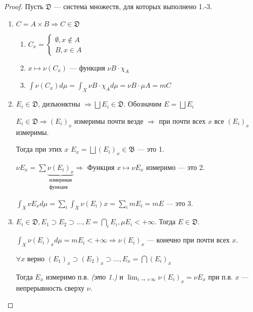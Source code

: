 \begin{proof}
    Пусть \(\mathfrak{D}\) --- система множеств, для которых выполнено 1.-3.

    \begin{enumerate}
        \item \(C = A \times B \Rightarrow C\in \mathfrak{D}\)

              \begin{enumerate}
                  \item \(C_x = \begin{cases}
                            \emptyset, x\notin A \\
                            B, x\in A
                        \end{cases}\)
                  \item \(x \mapsto \nu(C_x)\) --- функция \(\nu B \cdot \chi_A\)
                  \item \(\int \nu(C_x) d\mu = \int_X \nu B \cdot \chi_A d \mu = \nu B \cdot \mu A = mC\)
              \end{enumerate}

        \item \(E_i \in \mathfrak{D}\), дизъюнктны \( \Rightarrow \bigsqcup E_i\in \mathfrak{D}\). Обозначим \(E = \bigsqcup E_i\)

              \(E_i \in \mathfrak{D} \Rightarrow (E_i)_x\) измеримы почти везде \( \Rightarrow \) при почти всех \(x\) все \((E_i)_x\) измеримы.

              Тогда при этих \(x\) \(E_x = \bigsqcup (E_i)_x \in \mathfrak{B}\) --- это 1.

              \(\nu E_x = \sum \underbrace{\nu(E_i)_x}_{\substack{\text{измеримая} \\ \text{функция}}} \Rightarrow\) Функция \(x \mapsto \nu E_x\) измеримо --- это 2.

              \(\int_X \nu E_x d\mu = \sum_i \int_X \nu(E_i) x = \sum_i m E_i = m E\) --- это 3.

        \item \(E_i \in \mathfrak{D}, E_1 \supset E_2 \supset \dots , E = \bigcap_i E_i, \mu E_i < +\infty\). Тогда \(E\in \mathfrak{D}\).

              \(\int_X \nu(E_i)_x d\mu = m E_i < +\infty \Rightarrow \nu(E_i)_x\) --- конечно при почти всех \(x\).

              \(\forall x\) верно \((E_1)_x \supset (E_2)_x \supset \dots , E_x = \bigcap (E_i)_x\)

              Тогда \(E_x\) измеримо п.в. \textit{(это 1.)} и \(\lim_{i \to +\infty} \nu(E_i)_x = \nu E_x\) при п.в. \(x\) --- непрерывность сверху \(\nu\).


\end{enumerate}
\end{proof}
